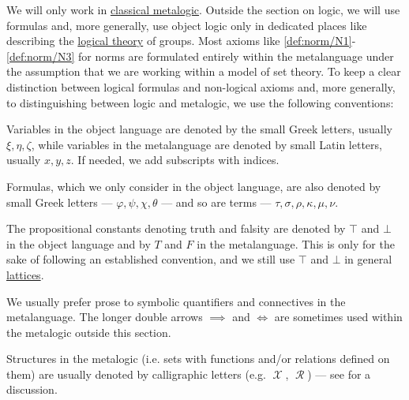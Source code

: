 \begin{remark}\label{rem:mathematical_logic_conventions}
  We will only work in \hyperref[def:propositional_derivation_system]{classical metalogic}. Outside the section on logic, we will use formulas and, more generally, use object logic only in dedicated places like  describing the \hyperref[def:first_order_theory]{logical theory} of groups. Most axioms like \ref{def:norm/N1}-\ref{def:norm/N3} for norms are formulated entirely within the metalanguage under the assumption that we are working within a model of set theory. To keep a clear distinction between logical formulas and non-logical axioms and, more generally, to distinguishing between logic and metalogic, we use the following conventions:

  \begin{thmenum}
     Variables in the object language are denoted by the small Greek letters, usually \( \xi, \eta, \zeta \), while variables in the metalanguage are denoted by small Latin letters, usually \( x, y, z \). If needed, we add subscripts with indices.

     Formulas, which we only consider in the object language, are also denoted by small Greek letters --- \( \varphi, \psi, \chi, \theta \) --- and so are terms --- \( \tau, \sigma, \rho, \kappa, \mu, \nu \).

     The propositional constants denoting truth and falsity are denoted by \( \top \) and \( \bot \) in the object language and by \( T \) and \( F \) in the metalanguage. This is only for the sake of following an established convention, and we still use \( \top \) and \( \bot \) in general \hyperref[def:semilattice/lattice]{lattices}.

     We usually prefer prose to symbolic quantifiers and connectives in the metalanguage. The longer double arrows \( \implies \) and \( \iff \) are sometimes used within the metalogic outside this section.

     Structures in the metalogic (i.e. sets with functions and/or relations defined on them) are usually denoted by calligraphic letters (e.g. \( \mscrX \), \( \mscrR \)) --- see  for a discussion.


\end{thmenum}
\end{remark}
